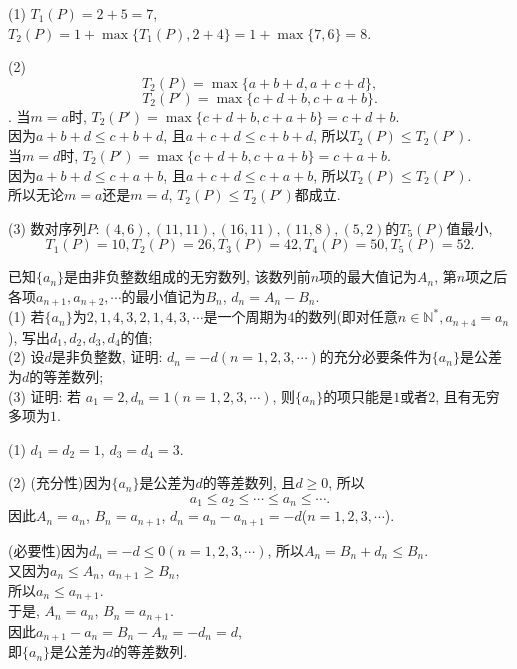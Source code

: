 \documentclass[green]{lsbook}
\begin{document}
(1) $T_1(P)=2+5=7$, $T_2(P)=1+\max \{T_1(P), 2+4\}=1+\max \{7, 6\}=8$. 

(2) \[T_2(P)=\max \{a+b+d, a+c+d\},\]
\[T_2(P')=\max \{c+d+b, c+a+b\}.\]. 
当$m=a$时, $T_2(P')=\max \{c+d+b, c+a+b\}=c+d+b$.\\
因为$a+b+d\leq c+b+d$, 且$a+c+d\leq c+b+d$, 所以$T_2(P)\leq T_2(P')$.\\
当$m=d$时, $T_2(P')=\max \{c+d+b, c+a+b\}=c+a+b$.\\
因为$a+b+d\leq c+a+b$, 且$a+c+d\leq c+a+b$, 所以$T_2(P)\leq T_2(P')$.\\
所以无论$m=a$还是$m=d$, $T_2(P)\leq T_2(P')$都成立. 	

(3) 数对序列$P\colon (4, 6), (11, 11), (16, 11), (11, 8), (5, 2)$的$T_5(P)$值最小, 
\[T_1(P)=10,T_2(P)=26,T_3(P)=42,T_4(P)=50,T_5(P)=52.\]
\newpage


\begin{tcolorbox}[applelight,title={2013.理20(本小题13分)}]
已知$\{a_n\}$是由非负整数组成的无穷数列, 该数列前$n$项的最大值记为$A_n$, 第$n$项之后各项$a_{n+1},a_{n+2},\cdots$的最小值记为$B_n$, $d_n=A_n -B_n$.\\
 (1) 若$\{a_n\}$为$2,1,4,3,2,1,4,3,\cdots$是一个周期为$4$的数列(即对任意$n\in \mathbb{N}^*, a_{n+4}=a_n$), 写出$d_1, d_2, d_3, d_4$的值;\\
 (2) 设$d$是非负整数, 证明: $d_n=-d(n=1,2,3,\cdots)$的充分必要条件为$\{a_n\}$是公差为$d$的等差数列;\\
 (3) 证明: 若 $a_1=2,d_n=1(n=1,2,3,\cdots)$, 则$\{a_n\}$的项只能是$1$或者$2$, 且有无穷多项为$1$.
\end{tcolorbox}


(1) $d_1=d_2=1$, $d_3=d_4=3$.  

(2) (充分性)因为$\{a_n\}$是公差为$d$的等差数列, 且$d\geq 0$, 所以
\[a_1\leq a_2\leq \cdots \leq a_n\leq \cdots. \] 
因此$A_n=a_n$, $B_n=a_{n+1}$, $d_n=a_n-a_{n+1}=-d$($n=1, 2, 3, \cdots$). 

(必要性)因为$d_n=-d\leq 0(n=1,2,3,\cdots)$, 所以$A_n=B_n+d_n\leq B_n$.\\ 
又因为$a_n\leq A_n$, $a_{n+1}\geq B_n$, \\
所以$a_n\leq a_{n+1}$.\\ 
于是, $A_n=a_n$, $B_n=a_{n+1}$. \\
因此$a_{n+1}-a_n=B_n-A_n=-d_n=d$, \\
即$\{a_n\}$是公差为$d$的等差数列. 
\end{document}
